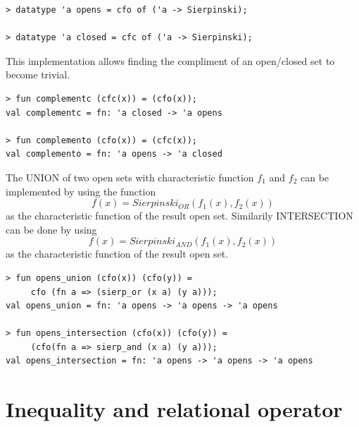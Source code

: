 \documentclass[12pt,twoside,notitlepage]{report}
\begin{document}
{
\begin{verbatim}
> datatype 'a opens = cfo of ('a -> Sierpinski);

> datatype 'a closed = cfc of ('a -> Sierpinski);
\end{verbatim}
}

This implementation allows finding the compliment of an open/closed set to become trivial.

{
\begin{verbatim}
> fun complementc (cfc(x)) = (cfo(x));
val complementc = fn: 'a closed -> 'a opens

> fun complemento (cfo(x)) = (cfc(x));
val complemento = fn: 'a opens -> 'a closed
\end{verbatim}
}

The UNION of two open sets with characteristic function $f_1$ and $f_2$ can be implemented by using the function
\begin{equation}
f(x) = Sierpinski_{OR} (f_1(x),f_2(x))
\end{equation}
as the characteristic function of the result open set. Similarily INTERSECTION can be done by using
\begin{equation}
f(x) = Sierpinski_{AND} (f_1(x),f_2(x))
\end{equation}
as the characteristic function of the result open set.\\
{
\begin{verbatim}
> fun opens_union (cfo(x)) (cfo(y)) = 
     cfo (fn a => (sierp_or (x a) (y a)));
val opens_union = fn: 'a opens -> 'a opens -> 'a opens

> fun opens_intersection (cfo(x)) (cfo(y)) = 
     (cfo(fn a => sierp_and (x a) (y a)));
val opens_intersection = fn: 'a opens -> 'a opens -> 'a opens
\end{verbatim}
}

\section {Inequality and relational operator}
\end{document}
